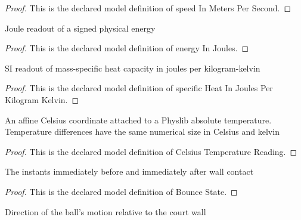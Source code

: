 \begin{proof}
  This is the declared model definition of speed In Meters Per Second.
\end{proof}
\begin{definition}
  \label{def:physics:phyx-mini-0490:phyxminiproblems-problemphyxmini0490-energyinjoules}
  Joule readout of a signed physical energy
\end{definition}
\begin{proof}
  This is the declared model definition of energy In Joules.
\end{proof}
\begin{definition}
  \label{def:physics:phyx-mini-0490:phyxminiproblems-problemphyxmini0490-specificheatinjoulesperkilogramkelvin}
  SI readout of mass-specific heat capacity in joules per kilogram-kelvin
\end{definition}
\begin{proof}
  This is the declared model definition of specific Heat In Joules Per Kilogram Kelvin.
\end{proof}
\begin{definition}
  \label{def:physics:phyx-mini-0490:phyxminiproblems-problemphyxmini0490-celsiustemperaturereading}
  An affine Celsius coordinate attached to a Physlib absolute temperature. Temperature differences have the same numerical size in Celsius and kelvin
\end{definition}
\begin{proof}
  This is the declared model definition of Celsius Temperature Reading.
\end{proof}
\begin{definition}
  \label{def:physics:phyx-mini-0490:phyxminiproblems-problemphyxmini0490-bouncestate}
  The instants immediately before and immediately after wall contact
\end{definition}
\begin{proof}
  This is the declared model definition of Bounce State.
\end{proof}
\begin{definition}
  \label{def:physics:phyx-mini-0490:phyxminiproblems-problemphyxmini0490-wallrelativedirection}
  Direction of the ball's motion relative to the court wall
\end{definition}
